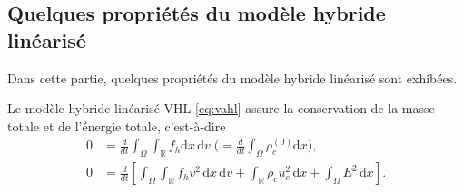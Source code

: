 
\subsection{Quelques propriétés du modèle hybride linéarisé}


Dans cette partie, quelques propriétés du modèle hybride linéarisé sont exhibées. 
\begin{pro}\label{p:vhl_conservation}
  Le modèle hybride linéarisé VHL \eqref{eq:vahl} assure la conservation de la masse totale et de l'énergie totale, c'est-à-dire
  $$
    \begin{aligned}
      0 &= \frac{d}{dt}  \int_\Omega \int_{\mathbb{R}} f_h \mathrm{d}x\,\mathrm{d}v \; \Big( \! = \frac{d}{dt}  \int_\Omega \rho^{(0)}_c \mathrm{d}x\Big), \\
      0 &= \frac{d}{dt} \left[ \int_\Omega \int_{\mathbb{R}} f_h v^2 \,\mathrm{d}x\,\mathrm{d}v+ \int_{\mathbb{R}} \rho_c u_c ^2 \,\mathrm{d}x+  \int_\Omega E^2 \,\mathrm{d}x\right].
    \end{aligned}
  $$
\end{pro}

